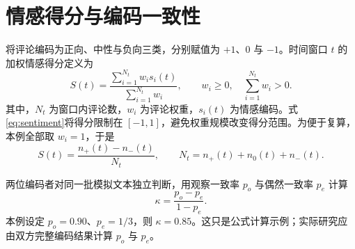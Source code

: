 \section{情感得分与编码一致性}
将评论编码为正向、中性与负向三类，分别赋值为 $+1$、$0$ 与 $-1$。时间窗口 $t$ 的加权情感得分定义为
\begin{equation}
  S(t)=\frac{\sum_{i=1}^{N_t}w_i s_i(t)}{\sum_{i=1}^{N_t}w_i},
  \qquad w_i\geq 0,\quad \sum_{i=1}^{N_t}w_i>0.
  \label{eq:sentiment}
\end{equation}
其中，$N_t$ 为窗口内评论数，$w_i$ 为评论权重，$s_i(t)$ 为情感编码。式\eqref{eq:sentiment}将得分限制在 $[-1,1]$，避免权重规模改变得分范围。为便于复算，本例全部取 $w_i=1$，于是
\begin{equation}
  S(t)=\frac{n_{+}(t)-n_{-}(t)}{N_t},
  \qquad N_t=n_{+}(t)+n_{0}(t)+n_{-}(t).
  \label{eq:sentiment-count}
\end{equation}

两位编码者对同一批模拟文本独立判断，用观察一致率 $p_o$ 与偶然一致率 $p_e$ 计算
\begin{equation}
  \kappa=\frac{p_o-p_e}{1-p_e}.
  \label{eq:kappa}
\end{equation}
本例设定 $p_o=0.90$、$p_e=1/3$，则 $\kappa=0.85$。这只是公式计算示例；实际研究应由双方完整编码结果计算 $p_o$ 与 $p_e$。
